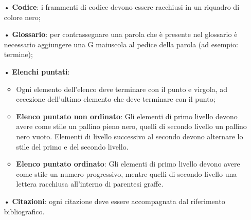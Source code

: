\begin{itemize}
\item[•] \textbf{Codice}: i frammenti di codice devono essere racchiusi in un riquadro di colore nero;
\item[•] \textbf{Glossario}: per contrassegnare una parola che è presente nel glossario è necessario aggiungere una G maiuscola al pedice della parola (ad esempio: {termine});
\item[•] \textbf{Elenchi puntati}:
\begin{itemize}
	\item Ogni elemento dell'elenco deve terminare con il punto e virgola, ad eccezione dell'ultimo elemento che deve terminare con il punto;
	\item \textbf{Elenco puntato non ordinato}:
	Gli elementi di primo livello devono avere come stile un pallino pieno nero, quelli di secondo livello un pallino nero vuoto. Elementi di livello successivo al secondo devono alternare lo stile del primo e del secondo livello.
	\item \textbf{Elenco puntato ordinato}:
	Gli elementi di primo livello devono avere come stile un numero progressivo, mentre quelli di secondo livello una lettera racchiusa all'interno di parentesi graffe. 
	\end{itemize}
\item[•] \textbf{Citazioni}: ogni citazione deve essere accompagnata dal riferimento bibliografico.
\end{itemize}

